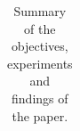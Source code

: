 \documentclass[authoryear]{elsarticle}
\begin{document}
\begin{landscape}
\begin{table}[!ht]
\begin{center}
\begin{tabular}{p{6cm}p{6cm}p{10cm}}
  \end{tabular}
 \end{center}
 \caption{Summary of the objectives, experiments and findings of the paper.}
\label{tab_summary}
\end{table}
\end{landscape}




\clearpage
\appendix

\end{document}
